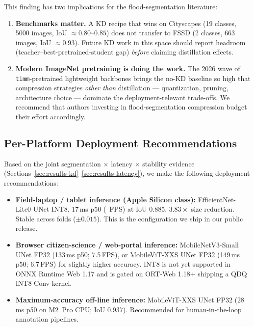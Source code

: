 This finding has two implications for the flood-segmentation literature:

\begin{enumerate}
\item \textbf{Benchmarks matter.} A KD recipe that wins on Cityscapes (19 classes, 5000 images, IoU $\approx 0.80$--$0.85$) does not transfer to FSSD (2 classes, 663 images, IoU $\approx 0.93$). Future KD work in this space should report headroom (teacher--best-pretrained-student gap) \emph{before} claiming distillation effects.
\item \textbf{Modern ImageNet pretraining is doing the work.} The 2026 wave of \texttt{timm}-pretrained lightweight backbones brings the no-KD baseline so high that compression strategies \emph{other than} distillation --- quantization, pruning, architecture choice --- dominate the deployment-relevant trade-offs. We recommend that authors investing in flood-segmentation compression budget their effort accordingly.
\end{enumerate}

\subsection{Per-Platform Deployment Recommendations}
\label{sec:discussion-deployment}

Based on the joint segmentation $\times$ latency $\times$ stability evidence (Sections~\ref{sec:results-kd}--\ref{sec:results-latency}), we make the following deployment recommendations:

\begin{itemize}
\item \textbf{Field-laptop / tablet inference (Apple Silicon class):} EfficientNet-Lite0 UNet INT8. 17\,ms p50 (\deployableMTwoFPS~FPS) at IoU 0.885, $3.83\times$ size reduction. Stable across folds ($\pm 0.015$). This is the configuration we ship in our public release.
\item \textbf{Browser citizen-science / web-portal inference:} MobileNetV3-Small UNet FP32 (133\,ms p50; 7.5\,FPS), or MobileViT-XXS UNet FP32 (149\,ms p50; 6.7\,FPS) for slightly higher accuracy. INT8 is not yet supported in ONNX Runtime Web 1.17 and is gated on ORT-Web 1.18$+$ shipping a QDQ INT8 Conv kernel.
\item \textbf{Maximum-accuracy off-line inference:} MobileViT-XXS UNet FP32 (28\,ms p50 on M2~Pro CPU; IoU 0.937). Recommended for human-in-the-loop annotation pipelines.
\end{itemize}

